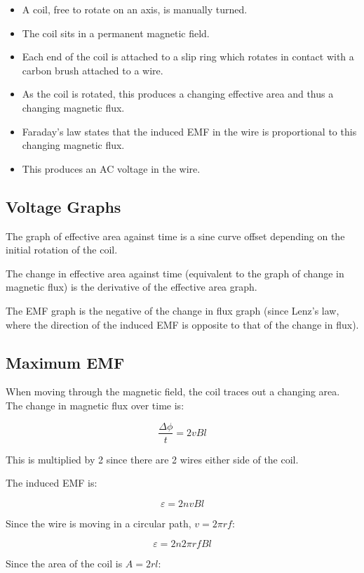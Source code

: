 \documentclass[a4paper,11pt]{article}
\begin{document}
\begin{itemize}
\item A coil, free to rotate on an axis, is manually turned.
\item The coil sits in a permanent magnetic field.
\item Each end of the coil is attached to a slip ring which rotates in contact
	with a carbon brush attached to a wire.
\item As the coil is rotated, this produces a changing effective area and thus
	a changing magnetic flux.
\item Faraday's law states that the induced EMF in the wire is proportional to
	this changing magnetic flux.
\item This produces an AC voltage in the wire.
\end{itemize}


\subsection{Voltage Graphs}

The graph of effective area against time is a sine curve offset depending on
the initial rotation of the coil.

The change in effective area against time (equivalent to the graph of change in
magnetic flux) is the derivative of the effective area graph.

The EMF graph is the negative of the change in flux graph (since Lenz's law,
where the direction of the induced EMF is opposite to that of the change in
flux).


\subsection{Maximum EMF}

When moving through the magnetic field, the coil traces out a changing area.
The change in magnetic flux over time is:

$$
\frac{\Delta \phi}{t} = 2vBl
$$

This is multiplied by 2 since there are 2 wires either side of the coil.

The induced EMF is:

$$
\varepsilon = 2nvBl
$$

Since the wire is moving in a circular path, $v = 2\pi r f$:

$$
\varepsilon = 2n 2 \pi r f B l
$$

Since the area of the coil is $A = 2 r l$:
\end{document}
